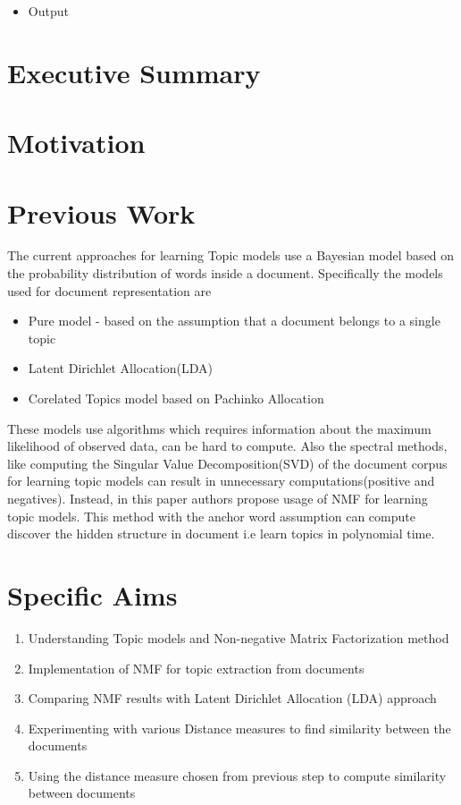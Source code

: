 \documentclass[a4paper,11pt]{article}
\begin{document}
\begin{itemize}
\item Output
\end{itemize}


\section{Executive Summary}


\section{Motivation}


\section{Previous Work}

The current approaches for learning Topic models use a Bayesian model based on the probability distribution of words inside a document. Specifically the models used for document representation are

\begin{itemize} 
\item Pure model - based on the assumption that a document belongs to a single topic
\item Latent Dirichlet Allocation(LDA)
\item Corelated Topics model based on Pachinko Allocation
\end{itemize}
These models use algorithms which requires information about the maximum likelihood of observed data, can be hard to compute. Also the spectral methods, like computing the Singular Value Decomposition(SVD) of the document corpus for learning topic models can result in unnecessary computations(positive and negatives). Instead, in this paper authors propose usage of NMF for learning topic models. This method with the anchor word assumption can compute discover the hidden structure in document i.e learn topics in polynomial time. 


\section{Specific Aims}

\begin{enumerate}
\item Understanding Topic models and Non-negative Matrix Factorization method
\item Implementation of NMF for topic extraction from documents
\item Comparing NMF results with Latent Dirichlet Allocation (LDA) approach
\item Experimenting with various Distance measures to find similarity between the documents
\item Using the distance measure chosen from previous step to compute similarity between documents
\end{enumerate}
\end{document}
